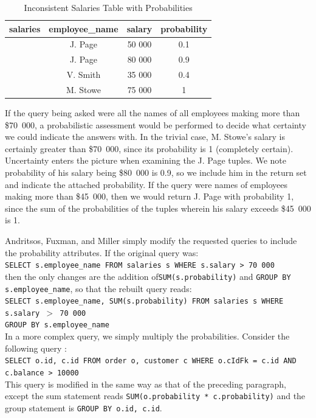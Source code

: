 \begin{table}[h]\begin{center}
        \begin{tabular}{r | c  c  c} 
					salaries & employee\_name & salary & probability\\ \hline
	           		 & J. Page  & 50 000 & 0.1 \\ 
	         		 & J. Page  & 80 000 & 0.9 \\ 
					 & V. Smith & 35 000 & 0.4 \\ 
					 & M. Stowe & 75 000 & 1 \\ 
        \end{tabular}
        \caption[Inconsistent Salaries Table with Probabilities]{Inconsistent Salaries Table with Probabilities \cite{CQ} \cite{CA}\label{inconsistent2}}
\end{center}\end{table}

If the query being asked were all the names of all employees making more than \$70~000, a probabilistic assessment would be performed to decide what certainty we could indicate the answers with. In the trivial case, M. Stowe's salary is certainly greater than \$70~000, since its probability is 1 (completely certain). Uncertainty enters the picture when examining the J. Page tuples. We note probability of his salary being \$80~000 is 0.9, so we include him in the return set and indicate the attached probability. If the query were names of employees making more than \$45~000, then we would return J. Page with probability 1, since the sum of the probabilities of the tuples wherein his salary exceeds \$45~000 is 1. 

Andritsos, Fuxman, and Miller simply modify the requested queries to include the probability attributes. If the original query was:\\
\texttt{SELECT s.employee\_name FROM salaries s WHERE s.salary > 70~000}\\
then the only changes are the addition of\texttt{SUM(s.probability)} and \texttt{GROUP BY s.employee\_name}, so that the rebuilt query reads:\\
\texttt{SELECT s.employee\_name, SUM(s.probability) FROM salaries s WHERE s.salary $>$ 70~000 \\ GROUP BY s.employee\_name}\\

In a more complex query, we simply multiply the probabilities. Consider the following query \cite{CA}: \\
\texttt{SELECT o.id, c.id FROM order o, customer c  WHERE o.cIdFk = c.id AND c.balance > 10000 } \\
This query is modified in the same way as that of the preceding paragraph, except the sum statement reads \texttt{SUM(o.probability * c.probability)} and the group statement is \texttt{GROUP BY o.id, c.id}.


